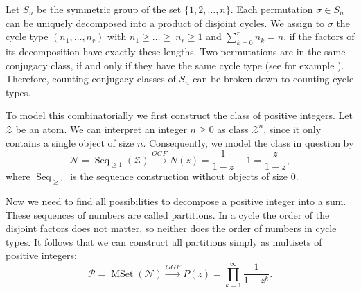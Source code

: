 \begin{exm}
\label{ex:parts}
Let $S_n$ be the symmetric group of the set $\{1, 2, \dots, n\}$. 
Each permutation $\sigma \in S_n$ can be uniquely decomposed into a product of disjoint cycles. 
We assign to $\sigma$ the cycle type $(n_1, \dots, n_r)$ with $n_1 \geq \dots \geq\ n_r \geq 1$ and $\sum_{k=0}^r n_k = n$, if the factors of its decomposition have exactly these lengths.
Two permutations are in the same conjugacy class, if and only if they have the same cycle type (see for example \cite{conjsn}).
Therefore, counting conjugacy classes of $S_n$ can be broken down to counting cycle types.

To model this combinatorially we first construct the class of positive integers. Let $\mathcal{Z}$ be an atom. We can interpret an integer $n \geq 0$ as class $\mathcal{Z}^n$, since it only contains a single object of size $n$.
Consequently, we model the class in question by
\begin{equation*}
    \mathcal{N} = \operatorname{Seq}_{\geq 1}(\mathcal{Z}) \xrightarrow{OGF} N(z) = \frac{1}{1-z} - 1 = \frac{z}{1 - z}, 
\end{equation*}
where $\operatorname{Seq}_{\geq 1}$ is the sequence construction without objects of size $0$.

Now we need to find all possibilities to decompose a positive integer into a sum. These sequences of numbers are called partitions.
In a cycle the order of the disjoint factors does not matter, so neither does the order of numbers in cycle types.
It follows that we can construct all partitions simply as multisets of positive integers:
\begin{equation*}
    \mathcal{P} = \operatorname{MSet}(\mathcal{N}) \xrightarrow{OGF} P(z) = \prod_{k=1}^\infty \frac{1}{1-z^k}.
\end{equation*}
\end{exm}











